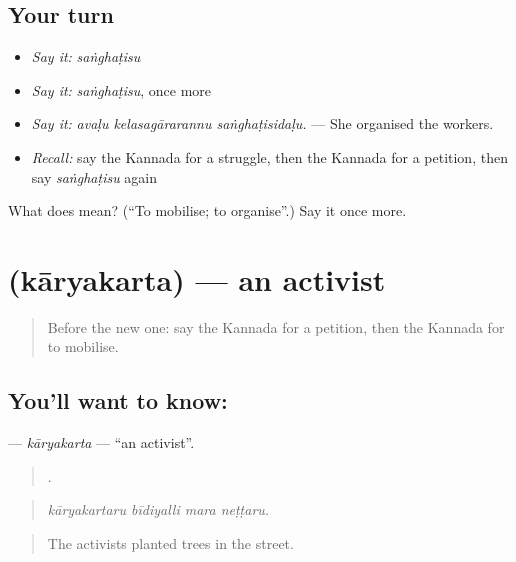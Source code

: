 \subsection*{Your turn}
\begin{itemize}
\raggedright
  \item \emph{Say it:} \emph{saṅghaṭisu}
  \item \emph{Say it:} \emph{saṅghaṭisu}, once more
  \item \emph{Say it:} \emph{avaḷu kelasagārarannu saṅghaṭisidaḷu.} — She organised the workers.
  \item \emph{Recall:} say the Kannada for a struggle, then the Kannada for a petition, then say \emph{saṅghaṭisu} again
\end{itemize}

\begin{tcolorbox}[breakable,colback=teal!4,colframe=teal!35!black,title={Before you move on}]
What does  mean? (\textquotedblleft{}To mobilise; to organise\textquotedblright{}.) Say it once more.
\end{tcolorbox}
\section[\texorpdfstring{\kn{ಕಾರ್ಯಕರ್ತ} (kāryakarta)}{ಕಾರ್ಯಕರ್ತ (kāryakarta)}]{ (kāryakarta) — an activist}

\label{lesson:KA-C398-karyakarta}



\begin{quote}
Before the new one: say the Kannada for a petition, then the Kannada for to mobilise.
\end{quote}

\subsection*{You'll want to know: }
\textbf{} — \emph{kāryakarta} — \textquotedblleft{}an activist\textquotedblright{}.

\begin{quote}
   .
\end{quote}

\begin{quote}
\emph{kāryakartaru bīdiyalli mara neṭṭaru.}
\end{quote}

\begin{quote}
The activists planted trees in the street.
\end{quote}

